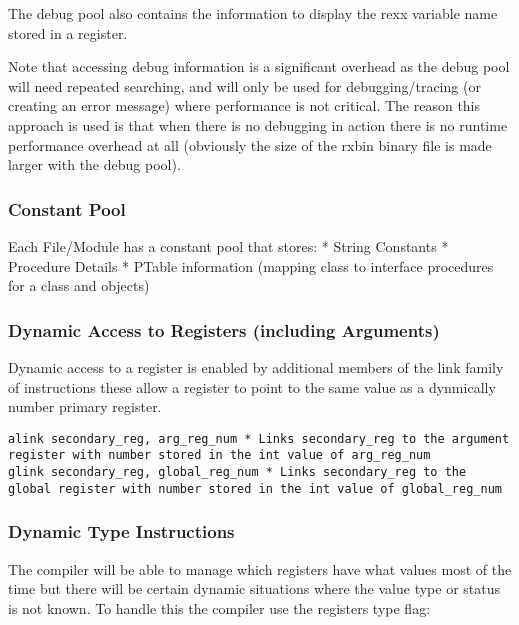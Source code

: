The debug pool also contains the information to display the rexx
variable name stored in a register.

Note that accessing debug information is a significant overhead as the
debug pool will need repeated searching, and will only be used for
debugging/tracing (or creating an error message) where performance is
not critical. The reason this approach is used is that when there is no
debugging in action there is no runtime performance overhead at all
(obviously the size of the rxbin binary file is made larger with the
debug pool).

\hypertarget{constant-pool}{%
\subsubsection{Constant Pool}\label{constant-pool}}

Each File/Module has a constant pool that stores: * String Constants *
Procedure Details * PTable information (mapping class to interface
procedures for a class and objects)

\hypertarget{dynamic-access-to-registers-including-arguments}{%
\subsubsection{Dynamic Access to Registers (including
Arguments)}\label{dynamic-access-to-registers-including-arguments}}

Dynamic access to a register is enabled by additional members of the
link family of instructions these allow a register to point to the same
value as a dynmically number primary register.

\begin{verbatim}
alink secondary_reg, arg_reg_num * Links secondary_reg to the argument register with number stored in the int value of arg_reg_num 
glink secondary_reg, global_reg_num * Links secondary_reg to the global register with number stored in the int value of global_reg_num 
\end{verbatim}

\hypertarget{dynamic-type-instructions}{%
\subsubsection{Dynamic Type
Instructions}\label{dynamic-type-instructions}}

The compiler will be able to manage which registers have what values
most of the time but there will be certain dynamic situations where the
value type or status is not known. To handle this the compiler use the
registers type flag:

